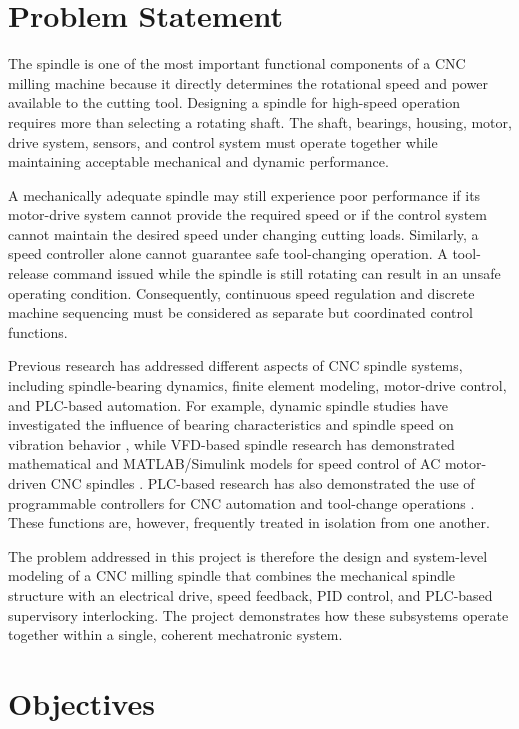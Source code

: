 \documentclass[12pt,a4paper]{report}
\begin{document}
	\section{Problem Statement}
	The spindle is one of the most important functional components of a CNC milling machine because it directly determines the rotational speed and power available to the cutting tool. Designing a spindle for high-speed operation requires more than selecting a rotating shaft. The shaft, bearings, housing, motor, drive system, sensors, and control system must operate together while maintaining acceptable mechanical and dynamic performance.
	
	A mechanically adequate spindle may still experience poor performance if its motor-drive system cannot provide the required speed or if the control system cannot maintain the desired speed under changing cutting loads. Similarly, a speed controller alone cannot guarantee safe tool-changing operation. A tool-release command issued while the spindle is still rotating can result in an unsafe operating condition. Consequently, continuous speed regulation and discrete machine sequencing must be considered as separate but coordinated control functions.
	
	Previous research has addressed different aspects of CNC spindle systems, including spindle-bearing dynamics, finite element modeling, motor-drive control, and PLC-based automation. For example, dynamic spindle studies have investigated the influence of bearing characteristics and spindle speed on vibration behavior \cite{ref11}, while VFD-based spindle research has demonstrated mathematical and MATLAB/Simulink models for speed control of AC motor-driven CNC spindles \cite{ref13}. PLC-based research has also demonstrated the use of programmable controllers for CNC automation and tool-change operations \cite{ref14,ref15}. These functions are, however, frequently treated in isolation from one another.
	
	The problem addressed in this project is therefore the design and system-level modeling of a CNC milling spindle that combines the mechanical spindle structure with an electrical drive, speed feedback, PID control, and PLC-based supervisory interlocking. The project demonstrates how these subsystems operate together within a single, coherent mechatronic system.
	
	\section{Objectives}
\end{document}

